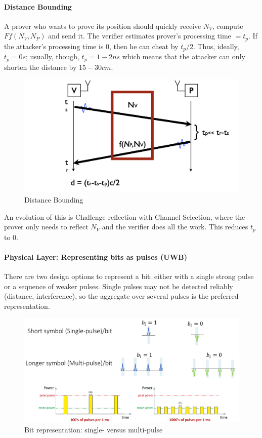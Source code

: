 \paragraph{Distance Bounding}
A prover who wants to prove its position should quickly receive $N_V$, compute $Ff(N_V,N_P)$ and send it.
The verifier estimates prover's processing time $=t_p$. If the attacker's processing time is $0$, then he can cheat by $t_p/2$. Thus, ideally, $t_p=0s$; usually, though, $t_p=1-2ns$ which means that the attacker can only shorten the distance by $15-30cm$.
\begin{figure}[h]
	\centering
	\includegraphics[scale=0.4]{images/5-dist-bounding.png}
	\caption{Distance Bounding}%
	\label{fig:dist_bounding}
\end{figure}
An evolution of this is Challenge reflection with Channel Selection, where the prover only needs to reflect $N_V$ and the verifier does all the work. This reduces $t_p$ to $0$.

\paragraph{Physical Layer: Representing bits as pulses (UWB)}
There are two design options to represent a bit: either with a single strong pulse or a sequence of weaker pulses.
Single pulses may not be detected reliably (distance, interference), so the aggregate over several pulses is the preferred representation.

\begin{figure}[h]
	\centering
	\includegraphics[scale=0.3]{images/5-single-multi-pulse.png}
	\caption{Bit representation: single- versus multi-pulse}%
	\label{fig:single-multi-pulse}
\end{figure}


